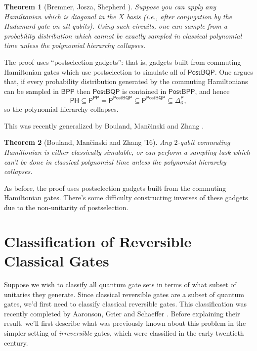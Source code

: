 \documentclass[12pt]{report}
\theoremstyle{plain}
\newtheorem{theorem}{Theorem}[section]
\theoremstyle{definition}
\begin{document}
\begin{theorem}[Bremner, Josza, Shepherd \cite{bremner}]
Suppose you can apply any Hamiltonian which is diagonal in the $X$ basis (i.e., after conjugation by the Hadamard gate on all qubits). Using such circuits, one can sample from a probability distribution which cannot be exactly sampled in classical polynomial time unless the polynomial hierarchy collapses.
\end{theorem}

The proof uses ``postselection gadgets'': that is, gadgets built from commuting Hamiltonian gates which use postselection to simulate all of $\mathsf{PostBQP}$. One argues that, if every probability distribution generated by the commuting Hamiltonians can be sampled in $\mathsf{BPP}$ then $\mathsf{PostBQP}$ is contained in $\mathsf{PostBPP}$, and hence
$$
\mathsf{PH} \subseteq \mathsf{P}^{\mathsf{PP}} = \mathsf{P}^{\mathsf{PostBQP}} \subseteq \mathsf{P}^{\mathsf{PostBQP}} \subseteq \mathsf{\Delta}_3^{\mathsf{P}},
$$
so the polynomial hierarchy collapses.

This was recently generalized by Bouland, Man\u{c}inski and Zhang \cite{bmz}.
\begin{theorem}[Bouland, Man\u{c}inski and Zhang '16]
Any $2$-qubit commuting Hamiltonian is either classically simulable, or can perform a sampling task which can't be done in classical polynomial time unless the polynomial hierarchy collapses.
\end{theorem}

As before, the proof uses postselection gadgets built from the commuting Hamiltonian gates. There's some difficulty constructing inverses of these gadgets due to the non-unitarity of postselection.

\section{Classification of Reversible Classical Gates}
\label{sec:classical}

Suppose we wish to classify all quantum gate sets in terms of what subset of unitaries they generate. Since classical reversible gates are a subset of quantum gates, we'd first need to classify classical reversible gates. This classification was recently completed by Aaronson, Grier and Schaeffer \cite{ReversibleGates}. Before explaining their result, we'll first describe what was previously known about this problem in the simpler setting of \emph{irreversible} gates, which were classified in the early twentieth century.
\end{document}
